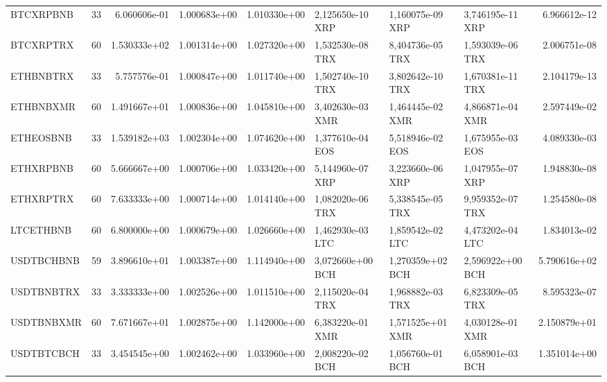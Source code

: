 \begin{tabular}{lrrrrlllr}
  BTCXRPBNB &    33 &   6.060606e-01 &   1.000683e+00 &    1.010330e+00 &  2,125650e-10 XRP &   1,160075e-09 XRP &           3,746195e-11 XRP &                      6.966612e-12 \\
  BTCXRPTRX &    60 &   1.530333e+02 &   1.001314e+00 &    1.027320e+00 &  1,532530e-08 TRX &   8,404736e-05 TRX &           1,593039e-06 TRX &                      2.006751e-08 \\
  ETHBNBTRX &    33 &   5.757576e-01 &   1.000847e+00 &    1.011740e+00 &  1,502740e-10 TRX &   3,802642e-10 TRX &           1,670381e-11 TRX &                      2.104179e-13 \\
  ETHBNBXMR &    60 &   1.491667e+01 &   1.000836e+00 &    1.045810e+00 &  3,402630e-03 XMR &   1,464445e-02 XMR &           4,866871e-04 XMR &                      2.597449e-02 \\
  ETHEOSBNB &    33 &   1.539182e+03 &   1.002304e+00 &    1.074620e+00 &  1,377610e-04 EOS &   5,518946e-02 EOS &           1,675955e-03 EOS &                      4.089330e-03 \\
  ETHXRPBNB &    60 &   5.666667e+00 &   1.000706e+00 &    1.033420e+00 &  5,144960e-07 XRP &   3,223660e-06 XRP &           1,047955e-07 XRP &                      1.948830e-08 \\
  ETHXRPTRX &    60 &   7.633333e+00 &   1.000714e+00 &    1.014140e+00 &  1,082020e-06 TRX &   5,338545e-05 TRX &           9,959352e-07 TRX &                      1.254580e-08 \\
  LTCETHBNB &    60 &   6.800000e+00 &   1.000679e+00 &    1.026660e+00 &  1,462930e-03 LTC &   1,859542e-02 LTC &           4,473202e-04 LTC &                      1.834013e-02 \\
 USDTBCHBNB &    59 &   3.896610e+01 &   1.003387e+00 &    1.114940e+00 &  3,072660e+00 BCH &   1,270359e+02 BCH &           2,596922e+00 BCH &                      5.790616e+02 \\
 USDTBNBTRX &    33 &   3.333333e+00 &   1.002526e+00 &    1.011510e+00 &  2,115020e-04 TRX &   1,968882e-03 TRX &           6,823309e-05 TRX &                      8.595323e-07 \\
 USDTBNBXMR &    60 &   7.671667e+01 &   1.002875e+00 &    1.142000e+00 &  6,383220e-01 XMR &   1,571525e+01 XMR &           4,030128e-01 XMR &                      2.150879e+01 \\
 USDTBTCBCH &    33 &   3.454545e+00 &   1.002462e+00 &    1.033960e+00 &  2,008220e-02 BCH &   1,056760e-01 BCH &           6,058901e-03 BCH &                      1.351014e+00 \\

\end{tabular}

